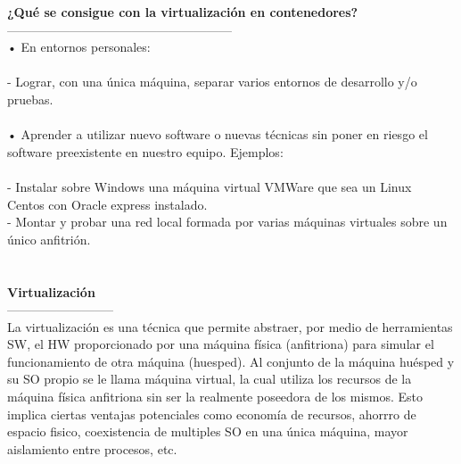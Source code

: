 \documentclass[twoside,twocolumn]{article}
\begin{document}
\begin{flushright}
\begin{itemize}
\textbf{¿Qué se consigue con la virtualización en contenedores?}\\
------------------------------------------------------
\textbf{}\\
• En entornos personales:
\textbf{}\\
\textbf{}\\
- Lograr, con una única máquina, separar varios entornos de
desarrollo y/o pruebas.
\textbf{}\\
\textbf{}\\
• Aprender a utilizar nuevo software o nuevas técnicas sin poner en
riesgo el software preexistente en nuestro equipo. Ejemplos:
\textbf{}\\
\textbf{}\\
- Instalar sobre Windows una máquina virtual VMWare que sea un Linux\textbf{}\\
Centos con Oracle express instalado.
\textbf{}\\
- Montar y probar una red local formada por varias máquinas virtuales
sobre un único anfitrión.
\textbf{}\\
\textbf{}\\
\textbf{}\\
\textbf{Virtualización}\\
--------------------------
\textbf{}\\
La virtualización es una técnica que permite abstraer, por medio de herramientas SW, el
HW proporcionado por una máquina física (anfitriona) para simular el funcionamiento de otra
máquina (huesped). Al conjunto de la máquina huésped y su SO propio se le llama máquina
virtual, la cual utiliza los recursos de la máquina física anfitriona sin ser la realmente poseedora
de los mismos. Esto implica ciertas ventajas potenciales como economía de recursos, ahorrro
de espacio fisico, coexistencia de multiples SO en una única máquina, mayor aislamiento entre
procesos, etc.
\textbf{}\\


\end{itemize}
\end{flushright}
\end{document}
